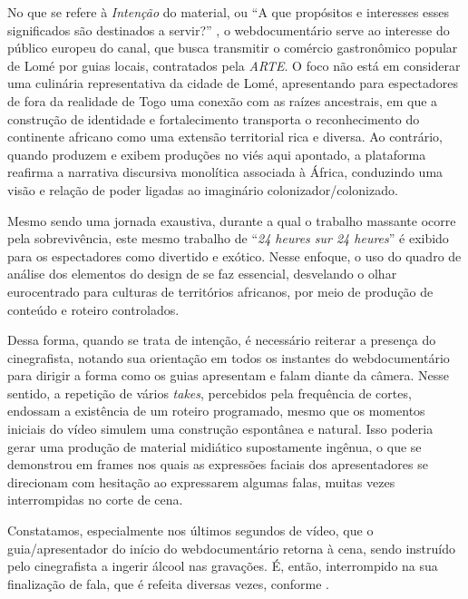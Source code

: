 \documentclass[portuguese]{textolivre}
\begin{document}
No que se refere à \emph{Intenção} do material, ou “A que propósitos e interesses esses significados são destinados a servir?” \cite[p. 293]{kalantzis_letramentos_2020}, o webdocumentário serve ao interesse do público europeu do canal, que busca transmitir o comércio gastronômico popular de Lomé por guias locais, contratados pela \textit{ARTE}. O foco não está em considerar uma culinária representativa da cidade de Lomé, apresentando para espectadores de fora da realidade de Togo uma conexão com as raízes ancestrais, em que a construção de identidade e fortalecimento transporta o reconhecimento do continente africano como uma extensão territorial rica e diversa. Ao contrário, quando produzem e exibem produções no viés aqui apontado, a plataforma reafirma a narrativa discursiva monolítica associada à África, conduzindo uma visão e relação de poder ligadas ao imaginário colonizador/colonizado.

Mesmo sendo uma jornada exaustiva, durante a qual o trabalho massante ocorre pela sobrevivência, este mesmo trabalho de “\textit{24 heures sur 24 heures}” é exibido para os espectadores como divertido e exótico. Nesse enfoque, o uso do quadro de análise dos elementos do design de \textcite{kalantzis_letramentos_2020} se faz essencial, desvelando o olhar eurocentrado para culturas de territórios africanos, por meio de produção de conteúdo e roteiro controlados.

Dessa forma, quando se trata de intenção, é necessário reiterar a presença do cinegrafista, notando sua orientação em todos os instantes do webdocumentário para dirigir a forma como os guias apresentam e falam diante da câmera. Nesse sentido, a repetição de vários \textit{takes}, percebidos pela frequência de cortes, endossam a existência de um roteiro programado, mesmo que os momentos iniciais do vídeo simulem uma construção espontânea e natural. Isso poderia gerar uma produção de material midiático supostamente ingênua, o que se demonstrou em frames nos quais as expressões faciais dos apresentadores se direcionam com hesitação ao expressarem algumas falas, muitas vezes interrompidas no corte de cena.

Constatamos, especialmente nos últimos segundos de vídeo, que o guia/apresentador do início do webdocumentário retorna à cena, sendo instruído pelo cinegrafista a ingerir álcool nas gravações. É, então, interrompido na sua finalização de fala, que é refeita diversas vezes, conforme .
\end{document}
